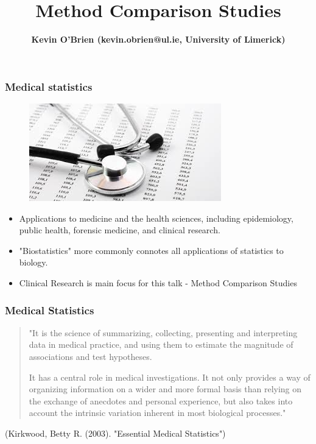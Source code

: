 \documentclass[compress]{beamer}        %
\title
	{
		{\huge Method Comparison Studies \\[0.3cm] }
	}
\author[Kevin O'Brien]{{\bf Kevin O'Brien (kevin.obrien@ul.ie, University of Limerick)}}
\institute[University of Limerick, Maths \& Stats Dept]{}
\date{}
\begin{document}
		
		\begin{frame}
			\vspace{-0.4cm}
			\titlepage
			
		\end{frame}
		
		
		\begin{frame}
			\frametitle{Medical statistics }
			\large
			\begin{figure}
				\centering
				\includegraphics[width=0.4\linewidth]{images/medstats}
			\end{figure}
			
			\begin{itemize}
				\item Applications to medicine and the health sciences, including epidemiology, public health, forensic medicine, and clinical research. 
				\item "Biostatistics" more commonly connotes all applications of statistics to biology.
				\item Clinical Research is main focus for this talk - Method Comparison Studies
			\end{itemize}
		\end{frame}	
		
		\begin{frame}
			\frametitle{Medical Statistics}
			\large
			\begin{quote} 
				"It is the science of summarizing, collecting, presenting and interpreting data in medical practice, and using them to estimate the magnitude of associations 
				and test hypotheses. 
				
				
				It has a central role in medical investigations. It not only provides a way of organizing information on a wider and more formal basis than relying on the exchange of anecdotes and personal experience, but also takes 
				into account the intrinsic variation inherent in most biological processes." 
				
			\end{quote}
			(Kirkwood, Betty R. (2003). "Essential Medical Statistics")
		\end{frame}
		
\end{document}
